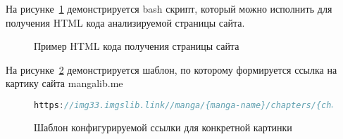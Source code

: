 
На рисунке~\ref{html-add} демонстрируется bash скрипт, который можно исполнить для получения HTML кода анализируемой страницы сайта.

\begin{figure}
    
    \caption{Пример HTML кода получения страницы сайта}
    \label{html-add}
\end{figure}

На рисунке~\ref{image-pattern-add} демонстрируется шаблон, по которому формируется ссылка на картику сайта mangalib.me

\begin{figure}
    \begin{lstlisting}[language=go]
        https://img33.imgslib.link//manga/{manga-name}/chapters/{chapter-hash}/{image-hash}
    \end{lstlisting}
    \caption{Шаблон конфигурируемой ссылки для конкретной картинки}
    \label{image-pattern-add}
\end{figure}